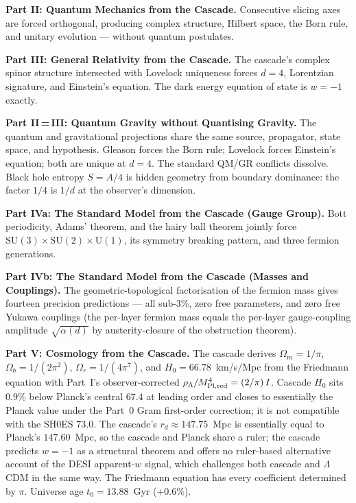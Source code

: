 \documentclass[12pt,a4paper]{article}
\begin{document}
\textbf{Part II: Quantum Mechanics from the Cascade.} Consecutive slicing axes are forced
orthogonal, producing complex structure, Hilbert space, the Born rule, and unitary
evolution --- without quantum postulates.

\textbf{Part III: General Relativity from the Cascade.} The cascade's complex spinor
structure intersected with Lovelock uniqueness forces $d = 4$, Lorentzian signature, and
Einstein's equation. The dark energy equation of state is $w = -1$ exactly.

\textbf{Part II\,=\,III: Quantum Gravity without Quantising Gravity.} The quantum and
gravitational projections share the same source, propagator, state space, and hypothesis.
Gleason forces the Born rule; Lovelock forces Einstein's equation; both are unique at
$d = 4$. The standard QM/GR conflicts dissolve. Black hole entropy $S = A/4$ is hidden
geometry from boundary dominance: the factor $1/4$ is $1/d$ at the observer's dimension.

\textbf{Part IVa: The Standard Model from the Cascade (Gauge Group).} Bott periodicity,
Adams' theorem, and the hairy ball theorem jointly force
$\mathrm{SU}(3)\times\mathrm{SU}(2)\times\mathrm{U}(1)$, its symmetry breaking pattern,
and three fermion generations.

\textbf{Part IVb: The Standard Model from the Cascade (Masses and Couplings).} The
geometric-topological factorisation of the fermion mass gives fourteen precision
predictions --- all sub-3\%, zero free parameters, and zero free Yukawa
couplings (the per-layer fermion mass equals the per-layer gauge-coupling
amplitude $\sqrt{\alpha(d)}$ by austerity-closure of the obstruction theorem).

\textbf{Part V: Cosmology from the Cascade.} The cascade derives
$\Omega_m = 1/\pi$, $\Omega_b = 1/(2\pi^2)$, $\Omega_r = 1/(4\pi^7)$,
and $H_0 = 66.78$~km/s/Mpc from the Friedmann equation with Part~I's
observer-corrected $\rho_\Lambda/M_{\rm Pl,red}^4 = (2/\pi)\,I$. Cascade
$H_0$ sits $0.9\%$ below Planck's central $67.4$ at leading order and
closes to essentially the Planck value under the Part~0 Gram
first-order correction; it is not compatible with the SH0ES $73.0$. The
cascade's $r_d \approx 147.75$~Mpc is essentially equal to Planck's
$147.60$~Mpc, so the cascade and Planck share a ruler; the cascade
predicts $w = -1$ as a structural theorem and offers no ruler-based
alternative account of the DESI apparent-$w$ signal, which challenges
both cascade and $\Lambda$CDM in the same way. The Friedmann equation
has every coefficient determined by $\pi$. Universe age
$t_0 = 13.88$~Gyr ($+0.6\%$).
\end{document}
